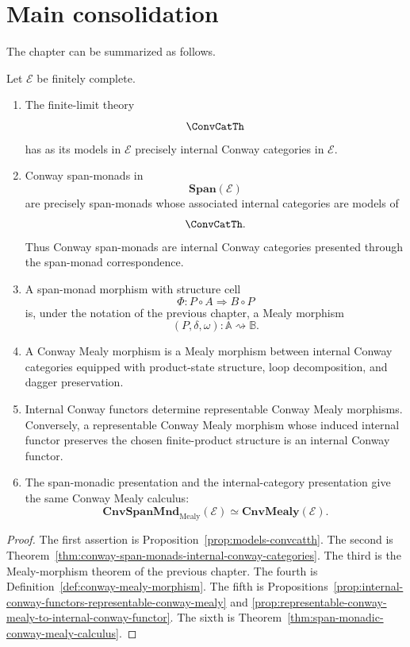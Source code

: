 \section{Main consolidation}
\label{sec:conway-main-consolidation}

The chapter can be summarized as follows.

\begin{theorem}
\label{thm:conway-main-consolidation}
Let \(\mathcal E\) be finitely complete.

\begin{enumerate}
\item The finite-limit theory
\[
\ConvCatTh
\]
has as its models in \(\mathcal E\) precisely internal Conway categories in
\(\mathcal E\).

\item Conway span-monads in
\[
\mathbf{Span}(\mathcal E)
\]
are precisely span-monads whose associated internal categories are models of
\[
\ConvCatTh.
\]
Thus Conway span-monads are internal Conway categories presented through the
span-monad correspondence.

\item A span-monad morphism with structure cell
\[
\Phi:P\circ A\Rightarrow B\circ P
\]
is, under the notation of the previous chapter, a Mealy morphism
\[
(P,\delta,\omega):\mathbb A\rightsquigarrow\mathbb B.
\]

\item A Conway Mealy morphism is a Mealy morphism between internal Conway
categories equipped with product-state structure, loop decomposition, and
dagger preservation.

\item Internal Conway functors determine representable Conway Mealy
morphisms.  Conversely, a representable Conway Mealy morphism whose induced
internal functor preserves the chosen finite-product structure is an internal
Conway functor.

\item The span-monadic presentation and the internal-category presentation
give the same Conway Mealy calculus:
\[
\mathbf{CnvSpanMnd}_{\mathrm{Mealy}}(\mathcal E)
\simeq
\mathbf{CnvMealy}(\mathcal E).
\]
\end{enumerate}
\end{theorem}

\begin{proof}
The first assertion is Proposition~\ref{prop:models-convcatth}.  The second
is Theorem~\ref{thm:conway-span-monads-internal-conway-categories}.  The
third is the Mealy-morphism theorem of the previous chapter.  The fourth is
Definition~\ref{def:conway-mealy-morphism}.  The fifth is
Propositions~\ref{prop:internal-conway-functors-representable-conway-mealy}
and
\ref{prop:representable-conway-mealy-to-internal-conway-functor}.  The sixth
is Theorem~\ref{thm:span-monadic-conway-mealy-calculus}.
\end{proof}


